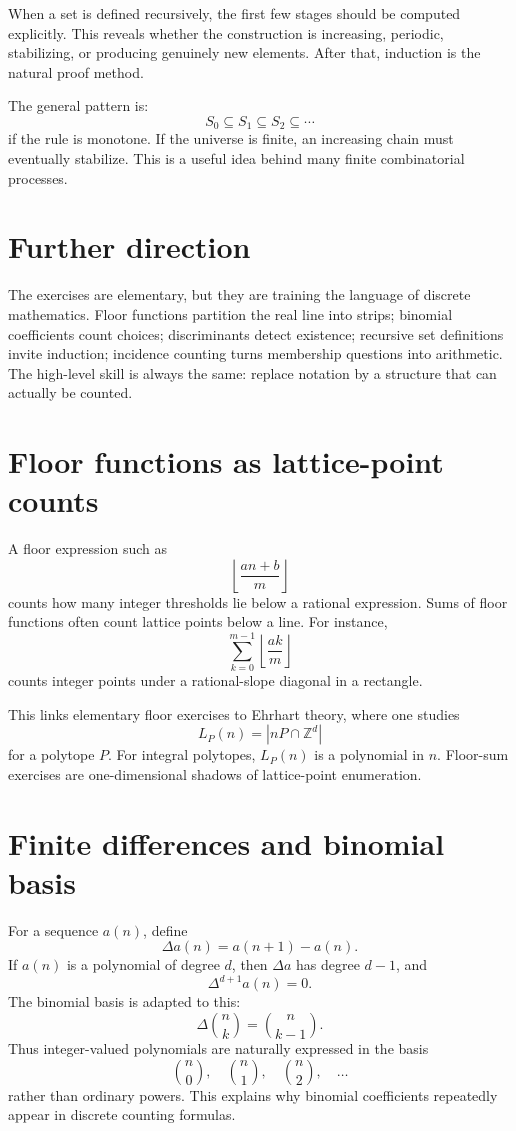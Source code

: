 When a set is defined recursively, the first few stages should be computed explicitly.  This reveals whether the construction is increasing, periodic, stabilizing, or producing genuinely new elements.  After that, induction is the natural proof method.

The general pattern is:
\[
  S_0\subseteq S_1\subseteq S_2\subseteq\cdots
\]
if the rule is monotone.  If the universe is finite, an increasing chain must eventually stabilize.  This is a useful idea behind many finite combinatorial processes.

\section{Further direction}

The exercises are elementary, but they are training the language of discrete mathematics.  Floor functions partition the real line into strips; binomial coefficients count choices; discriminants detect existence; recursive set definitions invite induction; incidence counting turns membership questions into arithmetic.  The high-level skill is always the same: replace notation by a structure that can actually be counted.

\section{Floor functions as lattice-point counts}

A floor expression such as
\[
  \left\lfloor \frac{an+b}{m}\right\rfloor
\]
counts how many integer thresholds lie below a rational expression.  Sums of floor functions often count lattice points below a line.  For instance,
\[
  \sum_{k=0}^{m-1}\left\lfloor \frac{ak}{m}\right\rfloor
\]
counts integer points under a rational-slope diagonal in a rectangle.

This links elementary floor exercises to Ehrhart theory, where one studies
\[
  L_P(n)=|nP\cap\mathbb Z^d|
\]
for a polytope \(P\).  For integral polytopes, \(L_P(n)\) is a polynomial in \(n\).  Floor-sum exercises are one-dimensional shadows of lattice-point enumeration.

\section{Finite differences and binomial basis}

For a sequence \(a(n)\), define
\[
  \Delta a(n)=a(n+1)-a(n).
\]
If \(a(n)\) is a polynomial of degree \(d\), then \(\Delta a\) has degree \(d-1\), and
\[
  \Delta^{d+1}a(n)=0.
\]
The binomial basis is adapted to this:
\[
  \Delta\binom nk=\binom n{k-1}.
\]
Thus integer-valued polynomials are naturally expressed in the basis
\[
  \binom n0,\quad \binom n1,\quad \binom n2,\quad\ldots
\]
rather than ordinary powers.  This explains why binomial coefficients repeatedly appear in discrete counting formulas.

